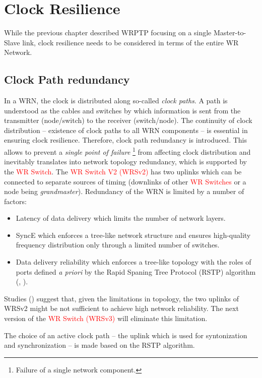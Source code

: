 \section{Clock Resilience}

While the previous chapter described WRPTP focusing on a single
Master-to-Slave link, clock resilience needs to be considered in terms
of the entire WR Network.

\subsection{Clock Path redundancy}

In a WRN, the clock is distributed along so-called \textit{clock
  paths}. A path is understood as the cables and switches by which
information is sent from the transmitter (node/switch) to the receiver
(switch/node). The continuity of clock distribution -- existence of
clock paths to all WRN components -- is essential in ensuring clock
resilience. Therefore, clock path redundancy is introduced. This
allows to prevent a \textit{single point of failure} \footnote{Failure
  of a single network component.} from affecting clock distribution
and inevitably translates into network topology redundancy, which is
supported by the \textcolor{red}{WR Switch}. The \textcolor{red}{WR
  Switch V2 (WRSv2)} has two uplinks which can be connected to
separate sources of timing (downlinks of other \textcolor{red}{WR
  Switches} or a node being \textit{grandmaster}). Redundancy of the
WRN is limited by a number of factors:
\begin{itemize}
\item Latency of data delivery which limits the number of network
  layers.
\item SyncE which enforces a tree-like network structure and ensures
  high-quality frequency distribution only through a limited number of
  switches.
\item Data delivery reliability which enforces a tree-like topology
  with the roles of ports defined \textit{a priori} by the Rapid
  Spaning Tree Protocol (RSTP) algorithm (\cite{biblio:IEEE8021D},
  \cite{biblio:Robustness}).
\end{itemize}
Studies (\cite{biblio:Robustness}) suggest that, given the limitations
in topology, the two uplinks of WRSv2 might be not sufficient to
achieve high network reliability. The next version of the
\textcolor{red}{WR Switch (WRSv3)} will eliminate this limitation.

The choice of an active clock path -- the uplink which is used for
syntonization and synchronization -- is made based on the RSTP
algorithm.

